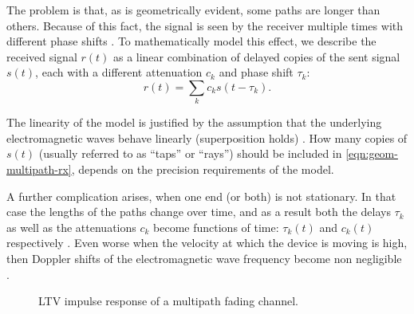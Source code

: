 The problem is that, as is geometrically evident, some paths are longer than others. Because of this fact, the signal is seen by the receiver multiple times with different phase shifts \cite{Gallager,Messier}. To mathematically model this effect, we describe the received signal \(r(t)\) as a linear combination of delayed copies of the sent signal \(s(t)\), each with a different attenuation \(c_k\) and phase shift \(\tau_k\):
\begin{equation} \label{eqn:geom-multipath-rx}
	r(t) = \sum_k c_k s(t - \tau_k).
\end{equation}

The linearity of the model is justified by the assumption that the underlying electromagnetic waves behave linearly (superposition holds) \cite{Gallager}. How many copies of \(s(t)\) (usually referred to as ``taps'' or ``rays'') should be included in \eqref{eqn:geom-multipath-rx}, depends on the precision requirements of the model.

A further complication arises, when one end (or both) is not stationary. In that case the lengths of the paths change over time, and as a result both the delays \(\tau_k\) as well as the attenuations \(c_k\) become functions of time: \(\tau_k(t)\) and \(c_k(t)\) respectively \cite{Gallager,Messier}. Even worse when the velocity at which the device is moving is high, then Doppler shifts of the electromagnetic wave frequency become non negligible \cite{Gallager}.

\begin{figure}
	\centering
	
	\caption{
		LTV impulse response of a multipath fading channel.
		\label{fig:multipath-impulse-response}
	}
\end{figure}

